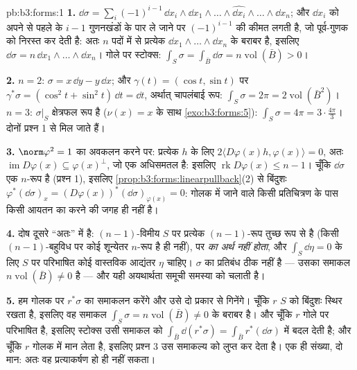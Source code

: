 \begin{solution}{pb:b3:forms:1}
\textbf{1.} $\dd\sigma = \sum_i(-1)^{i-1}\,\dd x_i\wedge\dd
x_1\wedge\dots\wedge\widehat{\dd x_i}\wedge\dots\wedge\dd
x_n$; और $\dd x_i$ को अपने से पहले के $i-1$ गुणनखंडों के पार
ले जाने पर $(-1)^{i-1}$ की कीमत लगती है, जो पूर्व-गुणक को
निरस्त कर देती है: अतः $n$ पदों में से प्रत्येक $\dd
x_1\wedge\dots\wedge\dd x_n$ के बराबर है, इसलिए
$\dd\sigma = n\,\dd x_1\wedge\dots\wedge\dd x_n$। गोले पर
स्टोक्स: $\int_S\sigma = \int_{\bar B}\dd\sigma =
n\operatorname{vol}(\bar B) > 0$।

\textbf{2.} $n = 2$: $\sigma = x\,\dd y - y\,\dd x$; और
$\gamma(t) = (\cos t, \sin t)$ पर $\gamma^*\sigma = (\cos^2t +
\sin^2t)\,\dd t = \dd t$, अर्थात् चापलंबाई रूप:
$\int_S\sigma = 2\pi = 2\operatorname{vol}(\bar B^2)$।
$n = 3$: $\sigma\vert_S$ क्षेत्रफल रूप है
($\nu(x) = x$ के साथ \cref{exo:b3:forms:5}):
$\int_S\sigma = 4\pi = 3\cdot\tfrac{4\pi}3$। दोनों प्रश्न 1
से मिल जाते हैं।

\textbf{3.} $\norm\varphi^2 = 1$ का अवकलन करने पर: प्रत्येक
$h$ के लिए $2\langle
D\varphi(x)h, \varphi(x)\rangle = 0$, अतः
$\operatorname{im}D\varphi(x) \subseteq \varphi(x)^\perp$,
जो एक अधिसमतल है: इसलिए
$\operatorname{rk}D\varphi(x) \leq n - 1$। चूँकि
$\dd\sigma$ एक $n$-रूप है (प्रश्न 1), इसलिए
\cref{prop:b3:forms:linearpullback}(2) से बिंदुशः
$\varphi^*(\dd\sigma)_x =
(D\varphi(x))^*(\dd\sigma)_{\varphi(x)} = 0$: गोलक में जाने
वाले किसी प्रतिचित्रण के पास किसी आयतन का  करने की
जगह ही नहीं है।

\textbf{4.} दोष दूसरे ``अतः'' में है: $(n-1)$-विमीय $S$ पर
प्रत्येक $(n-1)$-रूप तुच्छ रूप से  है (किसी
$(n-1)$-बहुविध पर कोई शून्येतर $n$-रूप है ही नहीं), पर
\emph{ का अर्थ  नहीं होता}, और $\int_S\dd\eta = 0$
के लिए $S$ पर परिभाषित कोई वास्तविक आद्यंतर $\eta$ चाहिए।
$\sigma$ का प्रतिबंध ठीक  नहीं है --- उसका समाकल
$n\operatorname{vol}(\bar B) \neq 0$ है --- और यही
अयथार्थता समूची समस्या को चलाती है।

\textbf{5.} हम गोलक पर $r^*\sigma$ का समाकलन करेंगे और उसे
दो प्रकार से गिनेंगे। चूँकि $r$ $S$ को बिंदुशः स्थिर रखता है,
इसलिए वह समाकल $\int_S\sigma = n\operatorname{vol}(\bar B)
\neq 0$ के बराबर है। और चूँकि $r$ गोले पर परिभाषित है, इसलिए
स्टोक्स उसी समाकल को $\int_{\bar B}\dd(r^*\sigma) =
\int_{\bar B}r^*(\dd\sigma)$ में बदल देती है; और चूँकि $r$
गोलक में मान लेता है, इसलिए प्रश्न 3 उस समाकल्य को लुप्त कर
देता है। एक ही संख्या, दो मान: अतः वह प्रत्याकर्षण हो ही
नहीं सकता।


\end{solution}
